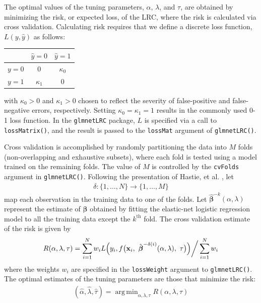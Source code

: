 \documentclass{article}
\DeclareMathOperator*{\argmin}{arg\,min}
\begin{document}
The optimal values of the tuning parameters, $\alpha$, $\lambda$, and $\tau$, are obtained by minimizing 
the risk, or expected loss, of 
the LRC, where the risk is calculated via cross validation.  Calculating risk requires that we define a discrete 
loss function, $L(y,\hat{y})$ as follows:
\begin{table}[H]
\begin{center}
\begin{tabular}{c|cc}
& $\hat{y} = 0$ & $\hat{y} = 1$ \\
\hline
$y = 0$ & $0$ & $\kappa_0$ \\
$y = 1$ & $\kappa_1$ & $0$ \\
\end{tabular}
\end{center}
\end{table}
\noindent with $\kappa_0 > 0$ and $\kappa_1 > 0$ chosen to reflect the severity of false-positive and 
false-negative errors, respectively.  Setting $\kappa_0 = \kappa_1 = 1$ results in the commonly used 0-1 loss
function.  In the {\tt glmnetLRC} package, $L$ is specified via a call to {\tt lossMatrix()}, and the result is passed to
the {\tt lossMat} argument of {\tt glmnetLRC()}.

Cross validation is accomplished by randomly partitioning the data into $M$ folds (non-overlapping and
exhaustive subsets), where each fold is tested using a model trained on the remaining folds. 
The value of $M$ is controlled by the {\tt cvFolds} argument in 
{\tt glmnetLRC()}. Following the presentation of Hastie, et al. \citeyear{Hastie}, let
\begin{align}
\label{eq:cv_map}
\delta:\{1,\ldots,N\} \rightarrow \{1, \ldots, M\}
\end{align}
\noindent map each observation in the training data to one of the folds.
Let $\hat{\boldsymbol{\beta}}^{-k}(\alpha,\lambda)$ represent the estimate of $\boldsymbol\beta$ obtained by
fitting the elastic-net logistic regression model to all the training data except the $k^{\text{th}}$ fold.
The cross validation estimate of the risk is given by
\begin{align}
\label{eq:risk}
R(\alpha,\lambda,\tau) = \sum_{i=1}^N w_i L \Bigl(y_i, f\bigl(\mathbf{x}_i,
~\hat{\boldsymbol{\beta}}^{-\delta(i)}(\alpha,\lambda), ~\tau \bigr) \Bigr) \bigg/ \sum_{i=1}^N w_i
\end{align}
\noindent where the weights $w_i$ are specified in the {\tt lossWeight} argument to {\tt glmnetLRC()}. 
The optimal estimates of the tuning parameters are those that minimize the risk:
\begin{align}
\label{eq:tuning_estimates}
(\hat\alpha,\hat\lambda,\hat\tau) = \argmin_{\alpha,\lambda,\tau} R(\alpha,\lambda,\tau)
\end{align}
\end{document}
